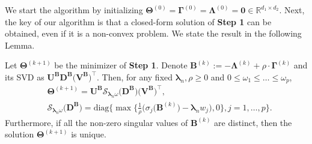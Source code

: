 \documentclass[alpha-refs]{wiley-article}
\begin{document}
We start the algorithm by initializing  $\boldsymbol{\Theta}^{(0)}=\boldsymbol{\Gamma}^{(0)}=\boldsymbol{\Lambda}^{(0)}=\boldsymbol{0} \in\mathbb{R}^{d_{1}\times d_{2}}$.
Next, the key of our algorithm is that a closed-form solution of \textbf{Step 1} can be obtained, even if it is a non-convex problem.
We state the result in the following Lemma.
\begin{lemma} \label{Lemma2.1}
    Let $\boldsymbol{\Theta}^{(k+1)}$ be the minimizer of \textbf{Step 1}.
    Denote $\boldsymbol{B}^{(k)}:=-\boldsymbol{\Lambda}^{(k)}+\rho \cdot \boldsymbol{\Gamma}^{(k)}$ and its SVD as $\boldsymbol{U}^{\textbf{B}}\boldsymbol{D}^{\textbf{B}}\big(\boldsymbol{V}^{\textbf{B}}\big)^{\top}$.
    Then, for any fixed $\boldsymbol{\lambda}_{n}, \rho \geq 0 $ and $0\leq \omega_{1} \leq \dots \leq \omega_{p}$,
    \begin{align*}
        &\boldsymbol{\Theta}^{(k+1)} = \boldsymbol{U}^{\textbf{B}}\mathcal{S}_{\boldsymbol{\lambda}_{n}\omega}\big(\boldsymbol{D}^{\textbf{B}}\big)\big(\boldsymbol{V}^{\textbf{B}}\big)^{\top}, \\
        &\mathcal{S}_{\boldsymbol{\lambda}_{n}\omega}\big(\boldsymbol{D}^{\textbf{B}}\big) = \text{diag}\bigg\{ \max\bigg\{\frac{1}{\rho}\big(\sigma_{j}(\boldsymbol{B}^{(k)}\big)-\boldsymbol{\lambda}_{n} w_{j}\big),0 \bigg\},  j=1,\dots,p \bigg\}.
    \end{align*}
    Furthermore, if all the non-zero singular values of $\boldsymbol{B}^{(k)}$ are distinct, then the solution $\boldsymbol{\Theta}^{(k+1)}$ is unique.
\end{lemma}
\end{document}
